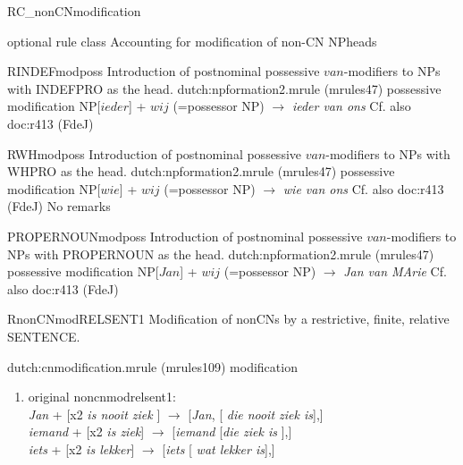 \begin{mruleclass}{RC\_nonCNmodification}
\begin{classdescr}
\kind optional rule class
\classtask Accounting for modification of non-CN NPheads
\classremarks
\nofilters
\nospeedrules
\noplannedrules
\norulesnotince
\begin{comments}
\end{comments}
\end{classdescr}
\begin{members}
\begin{member}
 RINDEFmodposs
Introduction of postnominal possessive $van$-modifiers to 
NPs
with INDEFPRO as the head.
\file dutch:npformation2.mrule (mrules47)
\semantics possessive modification 
\example NP[$ieder$] + $wij$ (=possessor NP) $\rightarrow$ {\em ieder van ons}
\remarks Cf. also doc:r413 (FdeJ)
\end{member}
\begin{member}
 RWHmodposs
Introduction of postnominal possessive $van$-modifiers to 
NPs
with WHPRO as the head.
\file dutch:npformation2.mrule (mrules47)
\semantics possessive modification 
\example NP[$wie$] + $wij$ (=possessor NP) $\rightarrow$ {\em wie van ons}
\remarks Cf. also doc:r413 (FdeJ)
\remarks No remarks
\end{member}
\begin{member}
 PROPERNOUNmodposs
Introduction of postnominal possessive $van$-modifiers to 
NPs
with PROPERNOUN as the head.
\file dutch:npformation2.mrule (mrules47)
\semantics possessive modification 
\example NP[$Jan$] + $wij$ (=possessor NP) $\rightarrow$ {\em Jan van MArie}
\remarks Cf. also doc:r413 (FdeJ)
\end{member}
\begin{member}
 RnonCNmodRELSENT1
 Modification of nonCNs
by a restrictive, finite, relative SENTENCE.

\file dutch:cnmodification.mrule (mrules109)
\semantics modification
\example 
\mbox{}\\
\begin{enumerate}
  \item

original noncnmodrelsent1:\\
{\em Jan}  + [x2 {\em is nooit ziek }] $\rightarrow$ [{\em Jan}, [{\em 
die nooit ziek is}],]\\
{\em iemand} + [x2 {\em is ziek}] $\rightarrow$ [{\em iemand} [{\em die ziek is
}],]\\
{\em iets} + [x2 {\em is lekker}] $\rightarrow$ [{\em iets} [{\em 
wat lekker is}],]


\end{enumerate}
\end{member}
\end{members}
\end{mruleclass}
